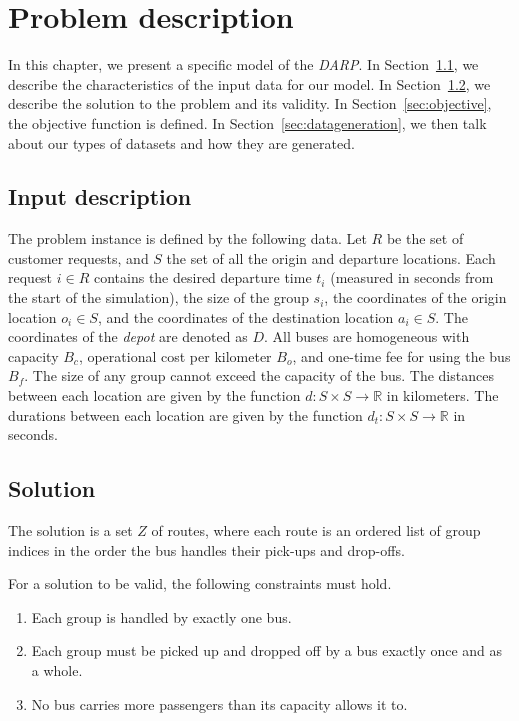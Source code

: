 \chapter{Problem description}\label{ch:problem}

In this chapter, we present a specific model of the \textit{DARP}. In Section~\ref{sec:inputdesc}, we describe the characteristics of the input data for our model. In Section~\ref{sec:solution}, we describe the solution to the problem and its validity. In Section~\ref{sec:objective}, the objective function is defined. In Section~\ref{sec:datageneration}, we then talk about our types of datasets and how they are generated.

\section{Input description}\label{sec:inputdesc}

The problem instance is defined by the following data. Let $R$ be the set of customer requests, and $S$ the set of all the origin and departure locations. Each request $i \in R$ contains the desired departure time $t_i$ (measured in seconds from the start of the simulation), the size of the group $s_i$, the coordinates of the origin location $o_i \in S$, and the coordinates of the destination location $a_i \in S$. The coordinates of the \textit{depot} are denoted as $D$. All buses are homogeneous with capacity $B_c$, operational cost per kilometer $B_o$, and one-time fee for using the bus $B_f$. The size of any group cannot exceed the capacity of the bus. The distances between each location are given by the function $d: S \times S \to \mathbb{R}$ in kilometers. The durations between each location are given by the function $d_t: S \times S \to \mathbb{R}$ in seconds.

\section{Solution} \label{sec:solution}

The solution is a set $Z$ of routes, where each route is an ordered list of group indices in the order the bus handles their pick-ups and drop-offs.

For a solution to be valid, the following constraints must hold.

\begin{enumerate}[(1)]\label{constraints}
    \setlength\itemsep{0pt}
    \item Each group is handled by exactly one bus.
    \item Each group must be picked up and dropped off by a bus exactly once and as a whole.
    \item No bus carries more passengers than its capacity allows it to.
\end{enumerate}

